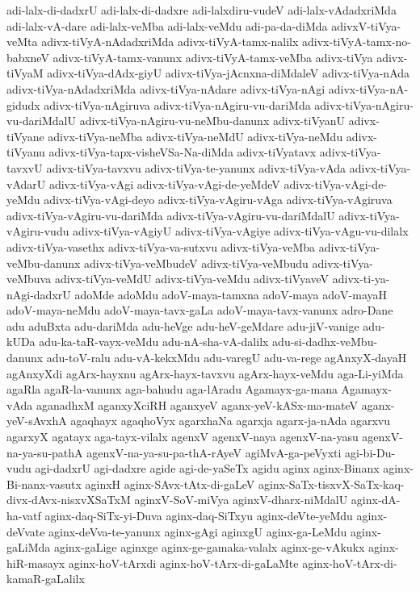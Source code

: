 {adi-lalx-di-dadxrU
adi-lalx-di-dadxre
adi-lalxdiru-vudeV
adi-lalx-vAdadxriMda
adi-lalx-vA-dare
adi-lalx-veMba
adi-lalx-veMdu
adi-pa-da-diMda
adivxV-tiVya-veMta
adivx-tiVyA-nAdadxriMda
adivx-tiVyA-tamx-nalilx
adivx-tiVyA-tamx-no-babxneV
adivx-tiVyA-tamx-vanunx
adivx-tiVyA-tamx-veMba
adivx-tiVya
adivx-tiVyaM
adivx-tiVya-dAdx-giyU
adivx-tiVya-jAcnxna-diMdaleV
adivx-tiVya-nAda
adivx-tiVya-nAdadxriMda
adivx-tiVya-nAdare
adivx-tiVya-nAgi
adivx-tiVya-nA-gidudx
adivx-tiVya-nAgiruva
adivx-tiVya-nAgiru-vu-dariMda
adivx-tiVya-nAgiru-vu-dariMdalU
adivx-tiVya-nAgiru-vu-neMbu-danunx
adivx-tiVyanU
adivx-tiVyane
adivx-tiVya-neMba
adivx-tiVya-neMdU
adivx-tiVya-neMdu
adivx-tiVyanu
adivx-tiVya-tapx-visheVSa-Na-diMda
adivx-tiVyatavx
adivx-tiVya-tavxvU
adivx-tiVya-tavxvu
adivx-tiVya-te-yanunx
adivx-tiVya-vAda
adivx-tiVya-vAdarU
adivx-tiVya-vAgi
adivx-tiVya-vAgi-de-yeMdeV
adivx-tiVya-vAgi-de-yeMdu
adivx-tiVya-vAgi-deyo
adivx-tiVya-vAgiru-vAga
adivx-tiVya-vAgiruva
adivx-tiVya-vAgiru-vu-dariMda
adivx-tiVya-vAgiru-vu-dariMdalU
adivx-tiVya-vAgiru-vudu
adivx-tiVya-vAgiyU
adivx-tiVya-vAgiye
adivx-tiVya-vAgu-vu-dilalx
adivx-tiVya-vasethx
adivx-tiVya-va-sutxvu
adivx-tiVya-veMba
adivx-tiVya-veMbu-danunx
adivx-tiVya-veMbudeV
adivx-tiVya-veMbudu
adivx-tiVya-veMbuva
adivx-tiVya-veMdU
adivx-tiVya-veMdu
adivx-tiVyaveV
adivx-ti-ya-nAgi-dadxrU
adoMde
adoMdu
adoV-maya-tamxna
adoV-maya
adoV-mayaH
adoV-maya-neMdu
adoV-maya-tavx-gaLa
adoV-maya-tavx-vanunx
adro-Dane
adu
aduBxta
adu-dariMda
adu-heVge
adu-heV-geMdare
adu-jiV-vanige
adu-kUDa
adu-ka-taR-vayx-veMdu
adu-nA-sha-vA-dalilx
adu-si-dadhx-veMbu-danunx
adu-toV-ralu
adu-vA-kekxMdu
adu-varegU
adu-va-rege
agAnxyX-dayaH
agAnxyXdi
agArx-hayxnu
agArx-hayx-tavxvu
agArx-hayx-veMdu
aga-Li-yiMda
agaRla
agaR-la-vanunx
aga-bahudu
aga-lAradu
Agamayx-ga-mana
Agamayx-vAda
aganadhxM
aganxyXciRH
aganxyeV
aganx-yeV-kASx-ma-mateV
aganx-yeV-sAvxhA
agaqhayx
agaqhoVyx
agarxhaNa
agarxja
agarx-ja-nAda
agarxvu
agarxyX
agatayx
aga-tayx-vilalx
agenxV
agenxV-naya
agenxV-na-yasu
agenxV-na-ya-su-pathA
agenxV-na-ya-su-pa-thA-rAyeV
agiMvA-ga-peVyxti
agi-bi-Du-vudu
agi-dadxrU
agi-dadxre
agide
agi-de-yaSeTx
agidu
aginx
aginx-Binanx
aginx-Bi-nanx-vasutx
aginxH
aginx-SAvx-tAtx-di-gaLeV
aginx-SaTx-tisxvX-SaTx-kaq-divx-dAvx-nisxvXSaTxM
aginxV-SoV-miVya
aginxV-dharx-niMdalU
aginx-dA-ha-vatf
aginx-daq-SiTx-yi-Duva
aginx-daq-SiTxyu
aginx-deVte-yeMdu
aginx-deVvate
aginx-deVva-te-yanunx
aginx-gAgi
aginxgU
aginx-ga-LeMdu
aginx-gaLiMda
aginx-gaLige
aginxge
aginx-ge-gamaka-valalx
aginx-ge-vAkukx
aginx-hiR-masayx
aginx-hoV-tArxdi
aginx-hoV-tArx-di-gaLaMte
aginx-hoV-tArx-di-kamaR-gaLalilx
}

